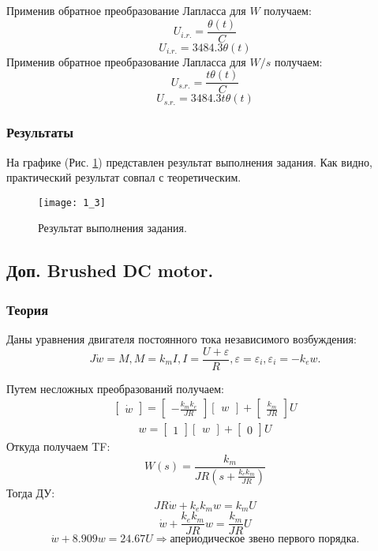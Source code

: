 \documentclass[16pt]{article}
\begin{document}
Применив обратное преобразование Лапласса для \(W\) получаем:
\[U_{i.r.} = \frac{\theta\left(t\right)}{C}\]
\[U_{i.r.} = 3484.3 \theta\left(t\right)\]
Применив обратное преобразование Лапласса для \(W / s\) получаем:
\[U_{s.r.} = \frac{t \theta\left(t\right)}{C}\]
\[U_{s.r.} = 3484.3 t \theta\left(t\right)\]
\subsubsection{Результаты}
На графике (Рис. \ref*{fig:fig2}) представлен результат выполнения задания. Как видно, практический результат совпал с теоретическим.
\begin{figure}[h!]
    \centering
    \texttt{[image: 1\_3]}
    \caption{Результат выполнения задания.}
    \label{fig:fig2}
\end{figure}

\newpage
\subsection{ Доп. Brushed DC motor.}

\subsubsection{Теория}
Даны уравнения двигателя постоянного тока независимого возбуждения:
\[J\dot{w} = M, M = k_mI, I = \frac{U + \varepsilon}{R}, \varepsilon = \varepsilon_i, \varepsilon_i = -k_ew.\]

Путем несложных преобразований получаем:
\begin{align}
    \begin{bmatrix}
        \dot{w}
    \end{bmatrix}
    = 
    \begin{bmatrix}
        -\frac{k_mk_e}{JR} 
    \end{bmatrix}
    \begin{bmatrix}
        w
    \end{bmatrix}
    + 
    \begin{bmatrix}
        \frac{k_m}{JR}
    \end{bmatrix}
    U
\end{align}
\begin{align}
    w 
    = 
    \begin{bmatrix}
        1
    \end{bmatrix}
    \begin{bmatrix}
        w
    \end{bmatrix}
    + 
    \begin{bmatrix}
        0
    \end{bmatrix}
    U
\end{align}
Откуда получаем TF:
\[
    W(s) = \frac{k_{m}}{J R \left(s + \frac{k_{e} k_{m}}{J R}\right)}
\]
Тогда ДУ:
\[
    JR\dot{w} + k_ek_mw = k_mU
\]
\[
    \dot{w} + \frac{k_ek_m}{JR}w = \frac{k_m}{JR}U
\]
\[
    \dot{w} + 8.909w = 24.67U \Rightarrow \text{апериодическое звено первого порядка}.
\]
\end{document}

